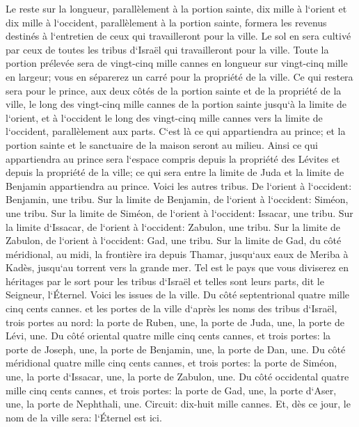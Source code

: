\verse Le reste sur la longueur, parallèlement à la portion sainte, dix mille à l`orient et dix mille à l`occident, parallèlement à la portion sainte, formera les revenus destinés à l`entretien de ceux qui travailleront pour la ville. 
\verse Le sol en sera cultivé par ceux de toutes les tribus d`Israël qui travailleront pour la ville. 
\verse Toute la portion prélevée sera de vingt-cinq mille cannes en longueur sur vingt-cinq mille en largeur; vous en séparerez un carré pour la propriété de la ville. 
\verse Ce qui restera sera pour le prince, aux deux côtés de la portion sainte et de la propriété de la ville, le long des vingt-cinq mille cannes de la portion sainte jusqu`à la limite de l`orient, et à l`occident le long des vingt-cinq mille cannes vers la limite de l`occident, parallèlement aux parts. C`est là ce qui appartiendra au prince; et la portion sainte et le sanctuaire de la maison seront au milieu. 
\verse Ainsi ce qui appartiendra au prince sera l`espace compris depuis la propriété des Lévites et depuis la propriété de la ville; ce qui sera entre la limite de Juda et la limite de Benjamin appartiendra au prince. 
\verse Voici les autres tribus. De l`orient à l`occident: Benjamin, une tribu. 
\verse Sur la limite de Benjamin, de l`orient à l`occident: Siméon, une tribu. 
\verse Sur la limite de Siméon, de l`orient à l`occident: Issacar, une tribu. 
\verse Sur la limite d`Issacar, de l`orient à l`occident: Zabulon, une tribu. 
\verse Sur la limite de Zabulon, de l`orient à l`occident: Gad, une tribu. 
\verse Sur la limite de Gad, du côté méridional, au midi, la frontière ira depuis Thamar, jusqu`aux eaux de Meriba à Kadès, jusqu`au torrent vers la grande mer. 
\verse Tel est le pays que vous diviserez en héritages par le sort pour les tribus d`Israël et telles sont leurs parts, dit le Seigneur, l`Éternel. 
\verse Voici les issues de la ville. Du côté septentrional quatre mille cinq cents cannes. 
\verse et les portes de la ville d`après les noms des tribus d`Israël, trois portes au nord: la porte de Ruben, une, la porte de Juda, une, la porte de Lévi, une. 
\verse Du côté oriental quatre mille cinq cents cannes, et trois portes: la porte de Joseph, une, la porte de Benjamin, une, la porte de Dan, une. 
\verse Du côté méridional quatre mille cinq cents cannes, et trois portes: la porte de Siméon, une, la porte d`Issacar, une, la porte de Zabulon, une. 
\verse Du côté occidental quatre mille cinq cents cannes, et trois portes: la porte de Gad, une, la porte d`Aser, une, la porte de Nephthali, une. 
\verse Circuit: dix-huit mille cannes. Et, dès ce jour, le nom de la ville sera: l`Éternel est ici. 
